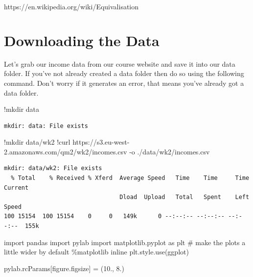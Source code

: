 \documentclass[
  letterpaper,
  DIV=11,
  numbers=noendperiod]{scrreprt}
\newenvironment{Shaded}{\begin{snugshade}}{\end{snugshade}}
\newcommand{\CommentTok}[1]{\textcolor[rgb]{0.37,0.37,0.37}{#1}}
\newcommand{\ErrorTok}[1]{\textcolor[rgb]{0.68,0.00,0.00}{#1}}
\newcommand{\FloatTok}[1]{\textcolor[rgb]{0.68,0.00,0.00}{#1}}
\newcommand{\ImportTok}[1]{\textcolor[rgb]{0.00,0.46,0.62}{#1}}
\newcommand{\NormalTok}[1]{\textcolor[rgb]{0.00,0.23,0.31}{#1}}
\newcommand{\OperatorTok}[1]{\textcolor[rgb]{0.37,0.37,0.37}{#1}}
\newcommand{\StringTok}[1]{\textcolor[rgb]{0.13,0.47,0.30}{#1}}
\begin{document}
https://en.wikipedia.org/wiki/Equivalisation

\hypertarget{downloading-the-data}{%
\section{Downloading the Data}\label{downloading-the-data}}

Let's grab our income data from our course website and save it into our
data folder. If you've not already created a data folder then do so
using the following command. Don't worry if it generates an error, that
means you've already got a data folder.

\begin{Shaded}
\begin{Highlighting}[]
\OperatorTok{!}\NormalTok{mkdir data}
\end{Highlighting}
\end{Shaded}

\begin{verbatim}
mkdir: data: File exists
\end{verbatim}

\begin{Shaded}
\begin{Highlighting}[]
\OperatorTok{!}\NormalTok{mkdir data}\OperatorTok{/}\NormalTok{wk2}
\OperatorTok{!}\NormalTok{curl https:}\OperatorTok{//}\NormalTok{s3.eu}\OperatorTok{{-}}\NormalTok{west}\OperatorTok{{-}}\FloatTok{2.}\ErrorTok{amazonaws}\NormalTok{.com}\OperatorTok{/}\NormalTok{qm2}\OperatorTok{/}\NormalTok{wk2}\OperatorTok{/}\NormalTok{incomes.csv }\OperatorTok{{-}}\NormalTok{o .}\OperatorTok{/}\NormalTok{data}\OperatorTok{/}\NormalTok{wk2}\OperatorTok{/}\NormalTok{incomes.csv}
\end{Highlighting}
\end{Shaded}

\begin{verbatim}
mkdir: data/wk2: File exists
  % Total    % Received % Xferd  Average Speed   Time    Time     Time  Current
                                 Dload  Upload   Total   Spent    Left  Speed
100 15154  100 15154    0     0   149k      0 --:--:-- --:--:-- --:--:--  155k
\end{verbatim}

\begin{Shaded}
\begin{Highlighting}[]
\ImportTok{import}\NormalTok{ pandas}
\ImportTok{import}\NormalTok{ pylab}
\ImportTok{import}\NormalTok{ matplotlib.pyplot }\ImportTok{as}\NormalTok{ plt}
\CommentTok{\# make the plots a little wider by default}
\OperatorTok{\%}\NormalTok{matplotlib inline}
\NormalTok{plt.style.use(}\StringTok{\textquotesingle{}ggplot\textquotesingle{}}\NormalTok{)}

\NormalTok{pylab.rcParams[}\StringTok{\textquotesingle{}figure.figsize\textquotesingle{}}\NormalTok{] }\OperatorTok{=}\NormalTok{ (}\FloatTok{10.}\NormalTok{, }\FloatTok{8.}\NormalTok{)}
\end{Highlighting}
\end{Shaded}
\end{document}
